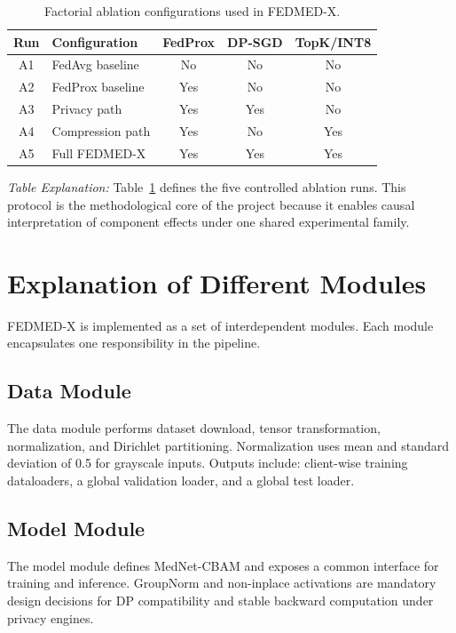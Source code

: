\begin{table}[!htbp]
\centering
\caption{Factorial ablation configurations used in FEDMED-X.}
\label{tab:ablation}
\small
\begin{tabular}{@{}clccc@{}}
\toprule
\textbf{Run} & \textbf{Configuration} & \textbf{FedProx} & \textbf{DP-SGD} & \textbf{TopK/INT8} \\
\midrule
A1 & FedAvg baseline    & No  & No  & No  \\
A2 & FedProx baseline   & Yes & No  & No  \\
A3 & Privacy path       & Yes & Yes & No  \\
A4 & Compression path   & Yes & No  & Yes \\
A5 & Full FEDMED-X      & Yes & Yes & Yes \\
\bottomrule
\end{tabular}
\end{table}

\noindent\emph{Table Explanation:} Table~\ref{tab:ablation} defines the five
controlled ablation runs. This protocol is the methodological core of the
project because it enables causal interpretation of component effects under
one shared experimental family.
\FloatBarrier

\section{Explanation of Different Modules}
FEDMED-X is implemented as a set of interdependent modules. Each module
encapsulates one responsibility in the pipeline.

\subsection{Data Module}
The data module performs dataset download, tensor transformation,
normalization, and Dirichlet partitioning. Normalization uses mean and
standard deviation of 0.5 for grayscale inputs. Outputs include: client-wise
training dataloaders, a global validation loader, and a global test loader.

\subsection{Model Module}
The model module defines MedNet-CBAM and exposes a common interface for
training and inference. GroupNorm and non-inplace activations are mandatory
design decisions for DP compatibility and stable backward computation under
privacy engines.

